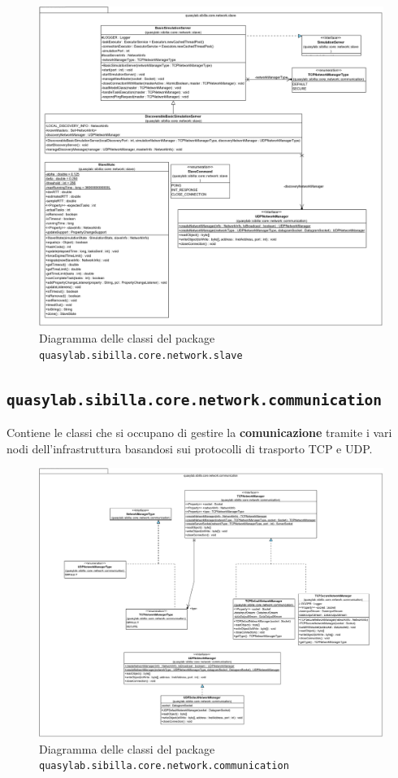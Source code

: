 \begin{figure}[H]
    \includegraphics[width=\linewidth]{images/quasylab.sibilla.core.network.slave.png}
    \captionsetup{justification=centering}
    \caption{Diagramma delle classi del package \texttt{quasylab.sibilla.core.network.slave}}
  \end{figure}

\subsection{\texttt{quasylab.sibilla.core.network.communication}} Contiene le classi che si occupano di gestire la \textbf{comunicazione} tramite i vari nodi dell’infrastruttura basandosi sui protocolli di trasporto TCP e UDP. 

\begin{figure}[H]
    \includegraphics[width=\linewidth]{images/quasylab.sibilla.core.network.communication.png}
    \captionsetup{justification=centering}
    \caption{Diagramma delle classi del package \texttt{quasylab.sibilla.core.network.communication}}
  \end{figure}

